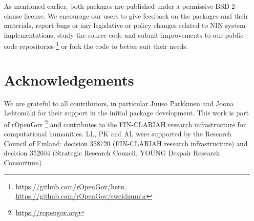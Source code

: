 As mentioned earlier, both packages are published under a permissive BSD 2-clause license. We encourage our users to give feedback on the packages and their materials, report bugs or any legislative or policy changes related to NIN system implementations, study the source code and submit improvements to our public code repositories \footnote{\url{https://github.com/rOpenGov/hetu}, \url{https://github.com/rOpenGov/sweidnumbr}} or fork the code to better suit their needs.

\section{Acknowledgements}\label{acknowledgements}

We are grateful to all contributors, in particular Juuso Parkkinen and Joona Lehtomäki for their support in the initial package development. This work is part of rOpenGov \footnote{\url{https://ropengov.org}} and contributes to the FIN-CLARIAH research infrastructure for computational humanities. LL, PK and AL were supported by the Research Council of Finland: decision 358720 (FIN-CLARIAH research infrastructure) and decision 352604 (Strategic Research Council, YOUNG Despair Research Consortium).

